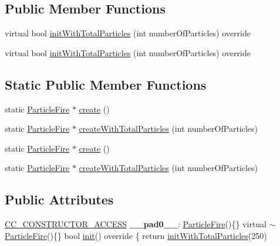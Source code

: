 \subsection*{Public Member Functions}
\begin{DoxyCompactItemize}
\item 
virtual bool \hyperlink{classParticleFire_ab4b3cbab1f857c1daa2219d47cca99c6}{init\+With\+Total\+Particles} (int number\+Of\+Particles) override
\item 
virtual bool \hyperlink{classParticleFire_a53432d0164422be9fb4bc1ef2394144c}{init\+With\+Total\+Particles} (int number\+Of\+Particles) override
\end{DoxyCompactItemize}
\subsection*{Static Public Member Functions}
\begin{DoxyCompactItemize}
\item 
static \hyperlink{classParticleFire}{Particle\+Fire} $\ast$ \hyperlink{classParticleFire_a9c9efebab1315ae6f5e4fbc32f3dd470}{create} ()
\item 
static \hyperlink{classParticleFire}{Particle\+Fire} $\ast$ \hyperlink{classParticleFire_a67b0a6ab2d86159484c6bd1e0f0f512a}{create\+With\+Total\+Particles} (int number\+Of\+Particles)
\item 
static \hyperlink{classParticleFire}{Particle\+Fire} $\ast$ \hyperlink{classParticleFire_a196e853e59b2875439489e3aa0f29f39}{create} ()
\item 
static \hyperlink{classParticleFire}{Particle\+Fire} $\ast$ \hyperlink{classParticleFire_a574a4c7817439eb7fee4f1f0ed064edb}{create\+With\+Total\+Particles} (int number\+Of\+Particles)
\end{DoxyCompactItemize}
\subsection*{Public Attributes}
\begin{DoxyCompactItemize}
\item 
\mbox{\label{classParticleFire_a9915321920229c8a0ea6c5d1036e2d90}} 
\hyperlink{_2cocos2d_2cocos_2base_2ccConfig_8h_a25ef1314f97c35a2ed3d029b0ead6da0}{C\+C\+\_\+\+C\+O\+N\+S\+T\+R\+U\+C\+T\+O\+R\+\_\+\+A\+C\+C\+E\+SS} {\bfseries \+\_\+\+\_\+pad0\+\_\+\+\_\+}\+: \hyperlink{classParticleFire}{Particle\+Fire}()\{\} virtual $\sim$\hyperlink{classParticleFire}{Particle\+Fire}()\{\} bool \hyperlink{classParticleSystem_a65c05b30432f6e8aeb45ba018f3a8d3f}{init}() override \{ return \hyperlink{classParticleFire_ab4b3cbab1f857c1daa2219d47cca99c6}{init\+With\+Total\+Particles}(250)
\end{DoxyCompactItemize}
